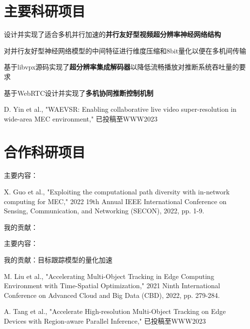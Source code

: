 \documentclass[]{deedy-resume-openfont}
\begin{document}
\begin{minipage}[t]{0.73\textwidth}


	\section{主要科研项目}
	\vspace{\topsep}
	\begin{tightemize}
		\item 设计并实现了适合多机并行加速的{\bfseries 并行友好型视频超分辨率神经网络结构}
		\item 对并行友好型神经网络模型的中间特征进行维度压缩和8bit量化以便在多机间传输
		\item 基于libvpx源码实现了{\bfseries 超分辨率集成解码器}以降低流畅播放对推断系统吞吐量的要求
		\item 基于WebRTC设计并实现了{\bfseries 多机协同推断控制机制}
		\item D. Yin et al., "WAEVSR: Enabling collaborative live video super-resolution in wide-area MEC environment," 已投稿至WWW2023
	\end{tightemize}
    \sectionsep

	\section{合作科研项目}
	\begin{tightemize}
		\item 主要内容：
		\item X. Guo et al., "Exploiting the computational path diversity with in-network computing for MEC," 2022 19th Annual IEEE International Conference on Sensing, Communication, and Networking (SECON), 2022, pp. 1-9.
		\item 我的贡献：
	\end{tightemize}
    \sectionsep

	\begin{tightemize}
		\item 主要内容：
		\item 我的贡献：目标跟踪模型的量化加速
		\item M. Liu et al., "Accelerating Multi-Object Tracking in Edge Computing Environment with Time-Spatial Optimization," 2021 Ninth International Conference on Advanced Cloud and Big Data (CBD), 2022, pp. 279-284.
		\item A. Tang et al., "Accelerate High-resolution Multi-Object Tracking on Edge Devices with Region-aware Parallel Inference," 已投稿至WWW2023
	\end{tightemize}
    \sectionsep
	


\end{minipage}
\end{document}
